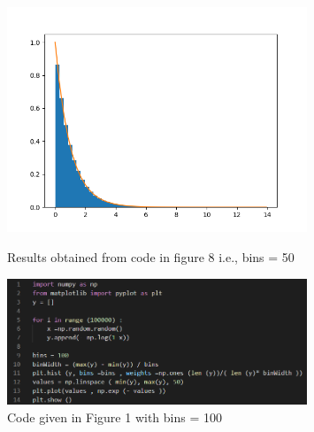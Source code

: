 \documentclass[answers]{exam}
\begin{document}
\begin{framed}
\begin{figure}[H] %
    \centering
    \includegraphics[width= 0.8\textwidth]{Q2.1_bins=50.png}
    \caption{Results obtained from code in figure 8 i.e., bins = 50}
    \vspace{2cm}
    \includegraphics[width= 0.8\textwidth]{Q2.1_bins=100_code.PNG}
    \caption{Code given in Figure 1 with bins = 100}
\end{figure}


\end{framed}
\end{document}
